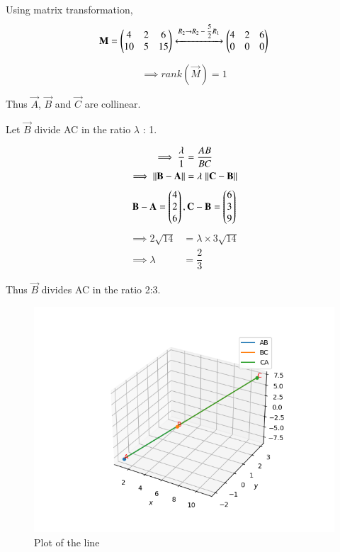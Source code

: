 \documentclass[journal,12pt,twocolumn]{IEEEtran}
\begin{document}
Using matrix transformation,
\begin{align}
\vec{M} = \begin{pmatrix}
    4 & 2 & 6\\
    10 & 5 & 15
    \end{pmatrix} \xleftrightarrow{\text{$R_2$}\rightarrow{\text{$R_2 - \dfrac{5}{2} R_1$ }}}
 \begin{pmatrix}
 4 & 2 & 6\\
 0 & 0 & 0
 \end{pmatrix}
\end{align}
 
\begin{equation}
   \implies rank(\vec{M}) = 1 
\end{equation}

Thus $\vec{A}$, $\vec{B}$ and $\vec{C}$ are collinear. 

Let $\vec{B}$ divide AC in the ratio $\lambda$ : 1. 

\begin{align}
    \implies \dfrac{\lambda}{1} &= \dfrac{AB}{BC}\\
    \implies \norm{\vec{B} - \vec{A}} &= \lambda\; \norm{\vec{C} - \vec{B}}
\end{align}
\begin{equation}
    \vec{B} - \vec{A} = \myvec{4\\2\\6}, \vec{C} - \vec{B} = \myvec{6\\3\\9}
\end{equation}
\begin{align}
    \implies 2\sqrt{14} &= \lambda \times 3\sqrt{14}\\
    \implies \lambda &= \dfrac{2}{3}
\end{align}

Thus $\vec{B}$ divides AC in the ratio 2:3.
 
\begin{figure}[!h]
         \includegraphics[width=\columnwidth]{figures/figure.png}
         \caption{Plot of the line}
         \label{plot}
\end{figure}
\end{document}
